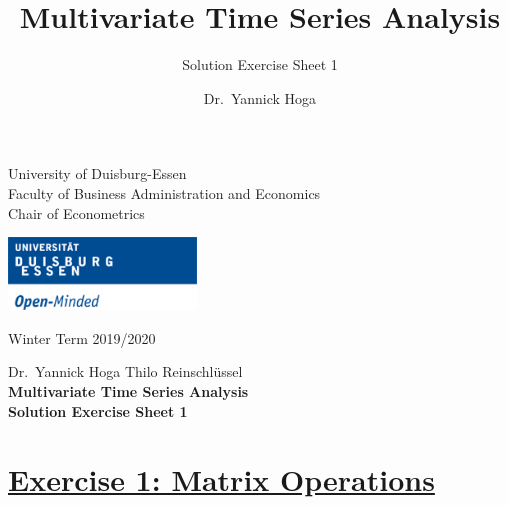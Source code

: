\documentclass[12pt,a4paper]{article}
\title{Multivariate Time Series Analysis}
\subtitle{Solution Exercise Sheet 1}
\author{Dr.~Yannick Hoga}
\date{}
\newcommand{\tmpsection}[1]{}
\let\tmpsection=\section
\renewcommand{\section}[1]{\tmpsection{\underline{#1}} }
\begin{document}





\restoregeometry



\begin{minipage}{0.6\textwidth}
University of Duisburg-Essen\\
Faculty of Business Administration and Economics\\
Chair of Econometrics\\
\end{minipage}

	\begin{flushright}
	\vspace{-3cm}
	\includegraphics*[width=5cm]{Includes/duelogo_en.png}\\
	\vspace{.125cm}
	\end{flushright}
\hspace{-0.005cm}Winter Term 2019/2020

\vspace{0.05cm}

\begin{center}
	\vspace{.25cm}
	Dr.~Yannick Hoga \hspace{.5cm} Thilo Reinschlüssel \\
	\vspace{.25cm}
	\textbf{\Large{Multivariate Time Series Analysis}}\\
	\vspace{.25cm}
	\textbf{\large{Solution Exercise Sheet 1}}\\
	\vspace{.125cm}
\end{center}





\hypertarget{exercise-1-matrix-operations}{%
\section{Exercise 1: Matrix
Operations}\label{exercise-1-matrix-operations}}
\end{document}
